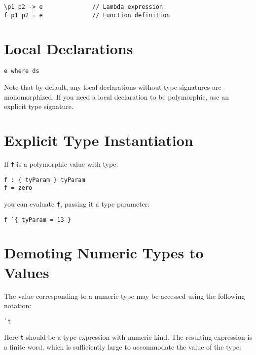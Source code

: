 \begin{verbatim}
\p1 p2 -> e              // Lambda expression
f p1 p2 = e              // Function definition
\end{verbatim}

\hypertarget{local-declarations}{%
\section{Local Declarations}\label{local-declarations}}

\begin{verbatim}
e where ds
\end{verbatim}

Note that by default, any local declarations without type signatures are
monomorphized. If you need a local declaration to be polymorphic, use an
explicit type signature.

\hypertarget{explicit-type-instantiation}{%
\section{Explicit Type
Instantiation}\label{explicit-type-instantiation}}

If \texttt{f} is a polymorphic value with type:

\begin{verbatim}
f : { tyParam } tyParam
f = zero
\end{verbatim}

you can evaluate \texttt{f}, passing it a type parameter:

\begin{verbatim}
f `{ tyParam = 13 }
\end{verbatim}

\hypertarget{demoting-numeric-types-to-values}{%
\section{Demoting Numeric Types to
Values}\label{demoting-numeric-types-to-values}}

The value corresponding to a numeric type may be accessed using the
following notation:

\begin{verbatim}
`t
\end{verbatim}

Here \texttt{t} should be a type expression with numeric kind. The
resulting expression is a finite word, which is sufficiently large to
accommodate the value of the type:

